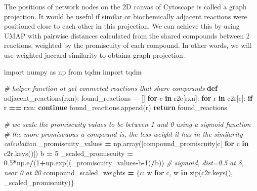 \documentclass[
]{book}
\newenvironment{Shaded}{\begin{snugshade}}{\end{snugshade}}
\newcommand{\BuiltInTok}[1]{#1}
\newcommand{\CommentTok}[1]{\textcolor[rgb]{0.56,0.35,0.01}{\textit{#1}}}
\newcommand{\ControlFlowTok}[1]{\textcolor[rgb]{0.13,0.29,0.53}{\textbf{#1}}}
\newcommand{\DecValTok}[1]{\textcolor[rgb]{0.00,0.00,0.81}{#1}}
\newcommand{\FloatTok}[1]{\textcolor[rgb]{0.00,0.00,0.81}{#1}}
\newcommand{\ImportTok}[1]{#1}
\newcommand{\KeywordTok}[1]{\textcolor[rgb]{0.13,0.29,0.53}{\textbf{#1}}}
\newcommand{\NormalTok}[1]{#1}
\newcommand{\OperatorTok}[1]{\textcolor[rgb]{0.81,0.36,0.00}{\textbf{#1}}}
\begin{document}
The positions of network nodes on the 2D canvas of Cytoscape is called a graph projection.
It would be useful if similar or biochemically adjacent reactions were positioned close to each other in this projection.
We can achieve this by using UMAP with pairwise distances calculated from the shared compounds between 2 reactions, weighted by
the promiscuity of each compound. In other words, we will use weighted jaccard similarity to obtaina graph projection.

\begin{Shaded}
\begin{Highlighting}[numbers=left,,]
\ImportTok{import}\NormalTok{ numpy }\ImportTok{as}\NormalTok{ np}
\ImportTok{from}\NormalTok{ tqdm }\ImportTok{import}\NormalTok{ tqdm}

\CommentTok{\# helper function ot get connected reactions that share compounds}
\KeywordTok{def}\NormalTok{ adjacent\_reactions(rxn):}
\NormalTok{    found\_reactions }\OperatorTok{=}\NormalTok{ []}
    \ControlFlowTok{for}\NormalTok{ c }\KeywordTok{in}\NormalTok{ r2c[rxn]:}
        \ControlFlowTok{for}\NormalTok{ r }\KeywordTok{in}\NormalTok{ c2r[c]:}
            \ControlFlowTok{if}\NormalTok{ r }\OperatorTok{==}\NormalTok{ rxn: }\ControlFlowTok{continue}
\NormalTok{            found\_reactions.append(r)}
    \ControlFlowTok{return}\NormalTok{ found\_reactions}

\CommentTok{\# we scale the promiscuity values to be between 1 and 0 using a sigmoid function}
\CommentTok{\# the more promiscuous a compound is, the less weight it has in the similarity calculation}
\NormalTok{\_promiscuity\_values }\OperatorTok{=}\NormalTok{ np.array([compound\_promiscuity[c] }\ControlFlowTok{for}\NormalTok{ c }\KeywordTok{in}\NormalTok{ c2r.keys()])}
\NormalTok{b }\OperatorTok{=} \DecValTok{5}
\NormalTok{\_scaled\_promiscuity }\OperatorTok{=} \FloatTok{0.5}\OperatorTok{*}\NormalTok{np.e}\OperatorTok{/}\NormalTok{(}\DecValTok{1}\OperatorTok{+}\NormalTok{np.exp((\_promiscuity\_values}\OperatorTok{{-}}\NormalTok{b}\OperatorTok{{-}}\DecValTok{1}\NormalTok{)}\OperatorTok{/}\NormalTok{b)) }\CommentTok{\# sigmoid, dist=0.5 at 8, near 0 at 20}
\NormalTok{compound\_scaled\_weights }\OperatorTok{=}\NormalTok{ \{c: w }\ControlFlowTok{for}\NormalTok{ c, w }\KeywordTok{in} \BuiltInTok{zip}\NormalTok{(c2r.keys(), \_scaled\_promiscuity)\}}


\end{Highlighting}
\end{Shaded}
\end{document}
